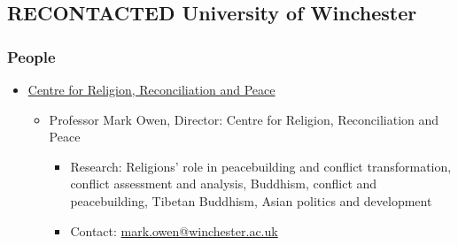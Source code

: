 \documentclass[11pt]{article}
\begin{document}
\subsection*{{\bfseries\sffamily RECONTACTED} University of Winchester}
\label{sec:orgc3d529c}
\subsubsection*{People}
\label{sec:org8093f37}
\begin{itemize}
\item \href{https://www.winchester.ac.uk/research/our-impactful-research/research-in-humanities-and-social-sciences/research-centres-and-networks/centre-for-religion-reconciliation-and-peace/}{Centre for Religion, Reconciliation and Peace}
\label{sec:org62b0818}
\begin{itemize}
\item Professor Mark Owen, Director: Centre for Religion, Reconciliation and Peace
\label{sec:org30f564e}
\begin{itemize}
\item Research: Religions' role in peacebuilding and conflict transformation, conflict assessment and analysis, Buddhism, conflict and peacebuilding, Tibetan Buddhism, Asian politics and development\\
\item Contact: \href{mailto:mark.owen@winchester.ac.uk}{mark.owen@winchester.ac.uk}\\
\end{itemize}
\end{itemize}
\end{itemize}
\end{document}
